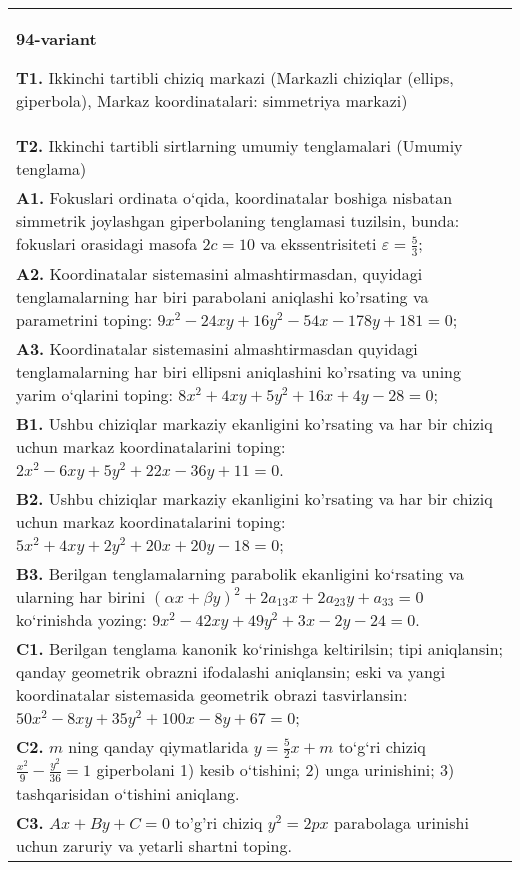\documentclass{article}
\begin{document}
\begin{tabular}{m{17cm}}
\textbf{94-variant}
\newline

\textbf{T1.} Ikkinchi tartibli chiziq markazi (Markazli chiziqlar (ellips, giperbola), Markaz koordinatalari: simmetriya markazi) \\
\textbf{T2.} Ikkinchi tartibli sirtlarning umumiy tenglamalari (Umumiy tenglama) \\
\textbf{A1.} Fokuslari ordinata o‘qida, koordinatalar boshiga nisbatan simmetrik joylashgan giperbolaning tenglamasi tuzilsin, bunda: fokuslari orasidagi masofa $2 c=10$ va ekssentrisiteti $\varepsilon=\frac{5}{3}$; \\
\textbf{A2.} Koordinatalar sistemasini almashtirmasdan, quyidagi tenglamalarning har biri parabolani aniqlashi ko'rsating va parametrini toping: $9 x^2-24 x y+16 y^2-54 x-178 y+181=0$; \\
\textbf{A3.} Koordinatalar sistemasini almashtirmasdan quyidagi tenglamalarning har biri ellipsni aniqlashini ko'rsating va uning yarim o‘qlarini toping: $8 x^2+4 x y+5 y^2+16 x+4 y-28=0$; \\
\textbf{B1.} Ushbu chiziqlar markaziy ekanligini ko'rsating va har bir chiziq uchun markaz koordinatalarini toping: $2 x^2-6 x y+5 y^2+22 x-36 y+11=0$. \\
\textbf{B2.} Ushbu chiziqlar markaziy ekanligini ko'rsating va har bir chiziq uchun markaz koordinatalarini toping: $5 x^2+4 x y+2 y^2+20 x+20 y-18=0$; \\
\textbf{B3.} Berilgan tenglamalarning parabolik ekanligini ko‘rsating va ularning har birini $(\alpha x+\beta y)^2+2 a_{13} x+2 a_{23} y+a_{33}=0$ ko‘rinishda yozing: $9 x^2-42 x y+49 y^2+3 x-2 y-24=0$. \\
\textbf{C1.} Berilgan tenglama kanonik ko‘rinishga keltirilsin; tipi aniqlansin; qanday geometrik obrazni ifodalashi aniqlansin; eski va yangi koordinatalar sistemasida geometrik obrazi tasvirlansin: $50 x^2-8 x y+35 y^2+100 x-8 y+67=0$; \\
\textbf{C2.} $m$ ning qanday qiymatlarida $y=\frac{5}{2} x+m$ to‘g‘ri chiziq $\frac{x^2}{9}-\frac{y^2}{36}=1$ giperbolani 1) kesib o‘tishini; 2) unga urinishini; 3) tashqarisidan o‘tishini aniqlang. \\
\textbf{C3.} $A x+B y+C=0$ to'g'ri chiziq $y^2=2 p x$ parabolaga urinishi uchun zaruriy va yetarli shartni toping. \\

\end{tabular}
\vspace{1cm}
\end{document}
